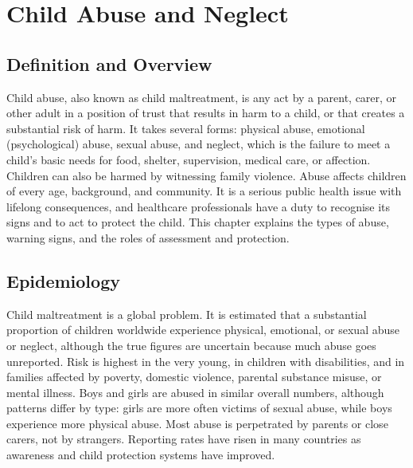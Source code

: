 \chapter{Child Abuse and Neglect}

\section*{Definition and Overview}
Child abuse, also known as child maltreatment, is any act by a parent, carer, or other adult in a position of trust that results in harm to a child, or that creates a substantial risk of harm. It takes several forms: physical abuse, emotional (psychological) abuse, sexual abuse, and neglect, which is the failure to meet a child's basic needs for food, shelter, supervision, medical care, or affection. Children can also be harmed by witnessing family violence. Abuse affects children of every age, background, and community. It is a serious public health issue with lifelong consequences, and healthcare professionals have a duty to recognise its signs and to act to protect the child. This chapter explains the types of abuse, warning signs, and the roles of assessment and protection.

\section*{Epidemiology}
Child maltreatment is a global problem. It is estimated that a substantial proportion of children worldwide experience physical, emotional, or sexual abuse or neglect, although the true figures are uncertain because much abuse goes unreported. Risk is highest in the very young, in children with disabilities, and in families affected by poverty, domestic violence, parental substance misuse, or mental illness. Boys and girls are abused in similar overall numbers, although patterns differ by type: girls are more often victims of sexual abuse, while boys experience more physical abuse. Most abuse is perpetrated by parents or close carers, not by strangers. Reporting rates have risen in many countries as awareness and child protection systems have improved.

